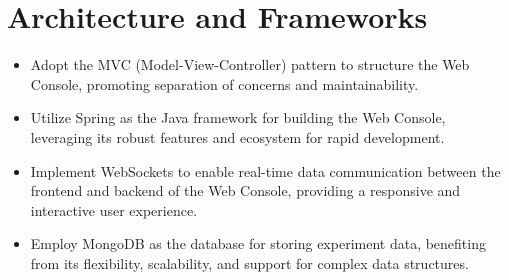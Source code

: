 \section{Architecture and Frameworks}

\begin{itemize}
    \item Adopt the MVC (Model-View-Controller) pattern to structure the Web Console, promoting separation of concerns and maintainability.
    \item Utilize Spring as the Java framework for building the Web Console, leveraging its robust features and ecosystem for rapid development.
    \item Implement WebSockets to enable real-time data communication between the frontend and backend of the Web Console, providing a responsive and interactive user experience.
    \item Employ MongoDB as the database for storing experiment data, benefiting from its flexibility, scalability, and support for complex data structures.
\end{itemize}
